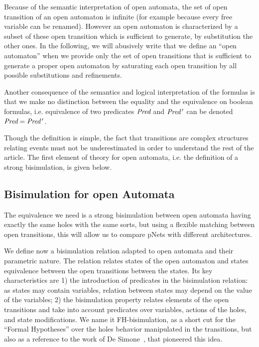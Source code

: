 \documentclass{lmcs}
\newcommand{\LUDO}[1]{\textcolor{darkgreen}{#1}}
\begin{document}
Because of the semantic interpretation of open automata, the set of open transition of an open automaton is infinite (for example because every free variable can be renamed). However an open automaton is characterized by a  subset of these open transition which is sufficient to generate, by substitution the other ones. In the following, we will abusively write that we define an ``open automaton'' when we provide only the set of open transitions that is sufficient to generate a proper open automaton by saturating each open transition by all possible substitutions and refinements.

Another consequence of the semantics and logical interpretation of the
formulas is that we make no distinction between the equality and the
equivalence on boolean formulas, i.e. equivalence of two predicates
$\Pred$ and $\Pred\,'$ can be denoted $\Pred=\Pred\,'$. 

	
Though the definition is simple, the fact that transitions are complex structures relating events must not be underestimated in order to understand the rest of the article. The first element of theory for open automata, i.e. the definition of a strong bisimulation, is given below.


\subsection{Bisimulation for open Automata}
\label{section:bisimulation}


The equivalence we need is a strong bisimulation between
open automata having exactly the same holes with the same sorts, but using a
flexible matching 
between open transitions, this will allow us to compare pNets
with different architectures.



We define now a bisimulation relation adapted to open automata and their parametric nature. The relation relates states of the open automaton and states equivalence between the open transitions between the states. Its key characteristics are 1) the introduction of predicates in the bisimulation relation: as states may contain variables, relation between states may depend on the value of the variables; 2) the bisimulation property relates elements of the open transitions and take into account predicates over variables, actions of the holes, and state modifications.
 We name it FH-bisimulation,
 as a short cut for the ``Formal Hypotheses'' over the holes behavior manipulated in the
 transitions, but also as a reference to the work of De Simone~\cite{deSimone85},
 that pioneered this idea.
\end{document}
